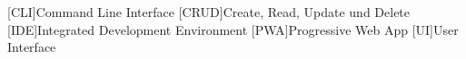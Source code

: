\begin{acronym}[MMMMMM]
 
	[CLI]{Command Line Interface}
	[CRUD]{Create, Read, Update und Delete}
	[IDE]{Integrated Development Environment}
	[PWA]{Progressive Web App}
	[UI]{User Interface}
	
	
\end{acronym}
